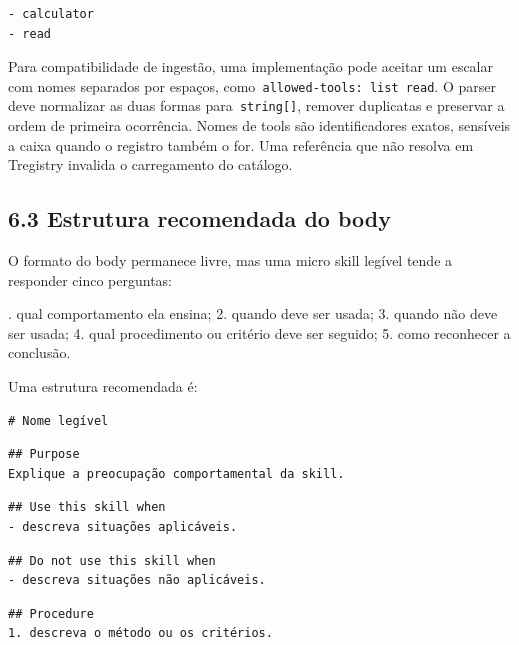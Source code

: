 \documentclass[12pt,a4paper]{article}
\begin{document}
\begin{Verbatim}[breaklines=true,breakanywhere=true,fontsize=\small]
- calculator
- read
\end{Verbatim}

Para compatibilidade de ingestão, uma implementação pode aceitar um escalar com nomes separados por espaços, como\texttt{ allowed-tools: list read}. O parser deve normalizar as duas formas para\texttt{ string[]}, remover duplicatas e preservar a ordem de primeira ocorrência. Nomes de tools são identificadores exatos, sensíveis a caixa quando o registro também o for. Uma referência que não resolva em Tregistry invalida o carregamento do catálogo.


\subsection*{6.3 Estrutura recomendada do body}

O formato do body permanece livre, mas uma micro skill legível tende a responder cinco perguntas:


. qual comportamento ela ensina; 2. quando deve ser usada; 3. quando não deve ser usada; 4. qual procedimento ou critério deve ser seguido; 5. como reconhecer a conclusão.\par

Uma estrutura recomendada é:


\begin{Verbatim}[breaklines=true,breakanywhere=true,fontsize=\small]
# Nome legível
\end{Verbatim}


\begin{Verbatim}[breaklines=true,breakanywhere=true,fontsize=\small]
## Purpose
Explique a preocupação comportamental da skill.
\end{Verbatim}

\begin{Verbatim}[breaklines=true,breakanywhere=true,fontsize=\small]
## Use this skill when
- descreva situações aplicáveis.
\end{Verbatim}

\begin{Verbatim}[breaklines=true,breakanywhere=true,fontsize=\small]
## Do not use this skill when
- descreva situações não aplicáveis.
\end{Verbatim}

\begin{Verbatim}[breaklines=true,breakanywhere=true,fontsize=\small]
## Procedure
1. descreva o método ou os critérios.
\end{Verbatim}
\end{document}
